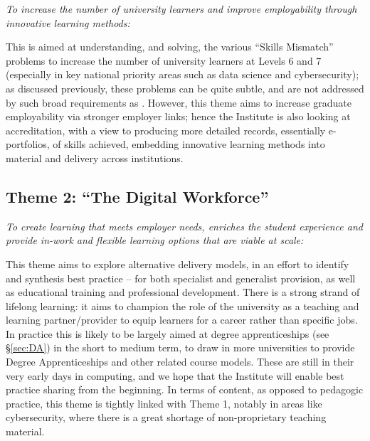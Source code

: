 \documentclass[conference]{IEEEtran}
\begin{document}
{\emph{To increase the number of university learners and improve
employability through innovative learning methods:}}\newline

\noindent This is aimed at understanding, and solving, the various
``Skills Mismatch'' problems to increase the number of university
learners at Levels 6 and 7 (especially in key national priority areas
such as data science and cybersecurity); as discussed previously,
these problems can be quite subtle, and are not addressed by such
broad requirements as \cite[Requirement 2.3.1]{BCS2018a}. However,
this theme aims to increase graduate employability via stronger
employer links; hence the Institute is also looking at accreditation,
with a view to producing more detailed records, essentially
e-portfolios, of skills achieved, embedding innovative learning
methods into material and delivery across institutions.


\subsection{Theme 2: ``The Digital Workforce''}

{\emph{To create learning that meets employer needs, enriches the
student experience and provide in-work and flexible learning options
that are viable at scale:}}\newline

\noindent This theme aims to explore alternative delivery models, in
an effort to identify and synthesis best practice -- for both
specialist and generalist provision, as well as educational training
and professional development. There is a strong strand of lifelong
learning: it aims to champion the role of the university as a teaching
and learning partner/provider to equip learners for a career rather
than specific jobs. In practice this is likely to be largely aimed at
degree apprenticeships (see \S\ref{sec:DA}) in the short to medium
term, to draw in more universities to provide Degree Apprenticeships
and other related course models. These are still in their very early
days in computing, and we hope that the Institute will enable best
practice sharing from the beginning. In terms of content, as opposed
to pedagogic practice, this theme is tightly linked with Theme 1,
notably in areas like cybersecurity, where there is a great shortage
of non-proprietary teaching material.
\end{document}

